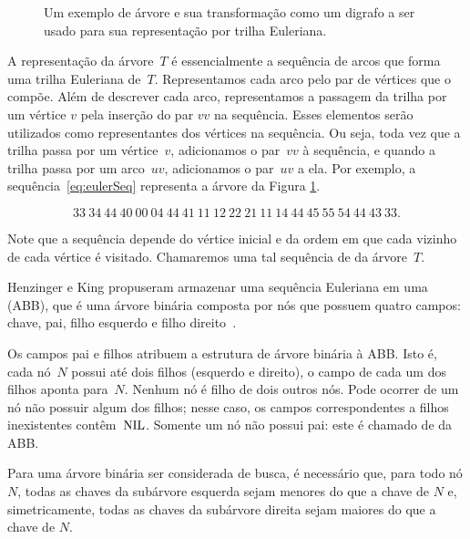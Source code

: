 \begin{figure}[htb]
\centering


\caption{Um exemplo de árvore e sua transformação como um digrafo a ser usado para sua representação por trilha Euleriana.}
\label{fig:exemploSeqEuler}
\end{figure}

A representação da árvore~$T$ é essencialmente a sequência de arcos que forma uma trilha Euleriana de~$T$. Representamos cada arco pelo par de vértices que o compõe. Além de descrever cada arco, representamos a passagem da trilha por um vértice $v$ pela inserção do par $vv$ na sequência. Esses elementos serão utilizados como representantes dos vértices na sequência. Ou seja, toda vez que a trilha passa por um vértice~$v$, adicionamos o par~$vv$ à sequência, e quando a trilha passa por um arco~$uv$, adicionamos o par~$uv$ a ela. Por exemplo, a sequência~\eqref{eq:eulerSeq} representa a árvore da  Figura \ref{fig:exemploSeqEuler}.

\begin{equation}
33~34~44~40~00~04~44~41~11~12~22~21~11~14~44~45~55~54~44~43~33.\label{eq:eulerSeq}  
\end{equation}

Note que a sequência depende do vértice inicial e da ordem em que cada vizinho de cada vértice é visitado. Chamaremos uma tal sequência de  da árvore~$T$.

Henzinger e King \cite{HenzingerKing} propuseram armazenar uma sequência Euleriana em uma  (ABB), que é uma árvore binária composta por nós que possuem  quatro campos: chave, pai, filho esquerdo e filho direito~\cite{CLRS}.

Os campos pai e filhos atribuem a estrutura de árvore binária à ABB. Isto é, cada nó~$N$ possui até dois filhos (esquerdo e direito), o campo  de cada um dos filhos aponta para~$N$. Nenhum nó é filho de dois outros nós. Pode ocorrer de um nó não possuir algum dos filhos; nesse caso, os campos correspondentes a filhos inexistentes contêm~$\text{NIL}$. Somente um nó não possui pai: este é chamado de  da ABB.

Para uma árvore binária ser considerada de busca, é necessário que, para todo nó $N$, todas as chaves da subárvore esquerda sejam menores do que a chave de $N$ e, simetricamente, todas as chaves da subárvore direita sejam maiores do que a chave de $N$.

